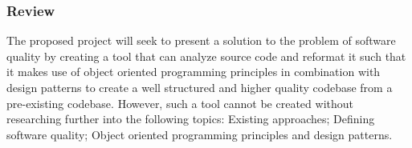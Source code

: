 \subsubsection{Review}
The proposed project will seek to present a solution to the problem of software quality by creating a tool that can analyze source code and reformat it such that it makes use of object oriented programming principles in combination with design patterns to create a well structured and higher quality codebase from a pre-existing codebase.
However, such a tool cannot be created without researching further into the following topics: Existing approaches; Defining software quality; Object oriented programming principles and design patterns.
